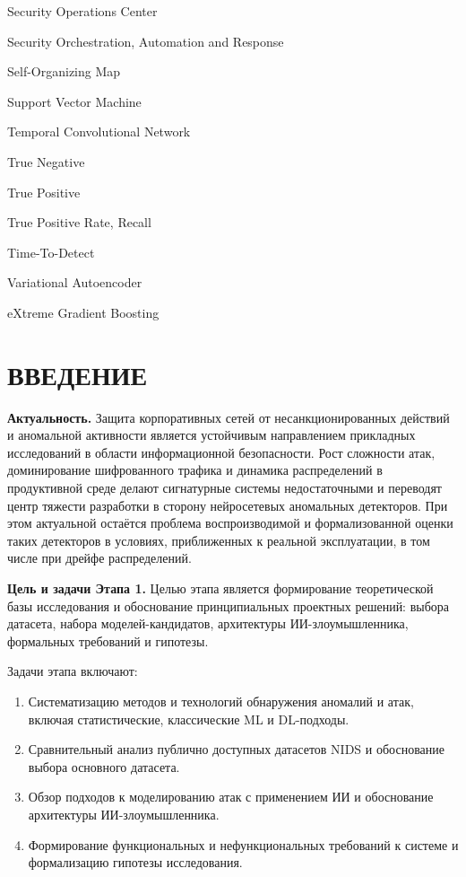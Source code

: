 \documentclass[14pt, a4paper]{extarticle}
\begin{document}
\begin{description}[font=\normalfont\bfseries, leftmargin=2.5em]
    \item[SOC] Security Operations Center
    \item[SOAR] Security Orchestration, Automation and Response
    \item[SOM] Self-Organizing Map
    \item[SVM] Support Vector Machine
    \item[TCN] Temporal Convolutional Network
    \item[TN] True Negative
    \item[TP] True Positive
    \item[TPR] True Positive Rate, Recall
    \item[TTD] Time-To-Detect
    \item[VAE] Variational Autoencoder
    \item[XGBoost] eXtreme Gradient Boosting
\end{description}

\newpage

\tableofcontents
\newpage

\section*{ВВЕДЕНИЕ}

\textbf{Актуальность.} Защита корпоративных сетей от несанкционированных
действий и аномальной активности является устойчивым направлением
прикладных исследований в области информационной безопасности. Рост
сложности атак, доминирование шифрованного трафика и динамика
распределений в продуктивной среде делают сигнатурные системы
недостаточными и переводят центр тяжести разработки в сторону
нейросетевых аномальных детекторов. При этом актуальной остаётся
проблема воспроизводимой и формализованной оценки таких детекторов в
условиях, приближенных к реальной эксплуатации, в том числе при дрейфе
распределений.

\textbf{Цель и задачи Этапа 1.} Целью этапа является формирование
теоретической базы исследования и обоснование принципиальных
проектных решений: выбора датасета, набора моделей-кандидатов,
архитектуры ИИ-злоумышленника, формальных требований и гипотезы.

Задачи этапа включают:
\begin{enumerate}
    \item Систематизацию методов и технологий обнаружения аномалий и
    атак, включая статистические, классические ML и DL-подходы.
    \item Сравнительный анализ публично доступных датасетов NIDS и
    обоснование выбора основного датасета.
    \item Обзор подходов к моделированию атак с применением ИИ и
    обоснование архитектуры ИИ-злоумышленника.
    \item Формирование функциональных и нефункциональных требований к
    системе и формализацию гипотезы исследования.
\end{enumerate}
\end{document}
